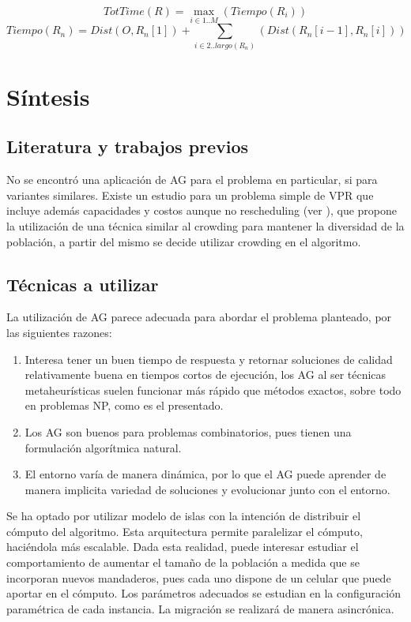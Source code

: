 \documentclass[9pt,conference]{IEEEtran}
\begin{document}
\[	TotTime(R) = \max\limits_{i \in 1..M}(Tiempo(R_i)) \]
\[	Tiempo(R_n) = Dist(O, R_n[1]) + \sum\limits_{i \in 2..largo(R_n)}(Dist(R_n[i-1], R_n[i])) \]

	\section{Síntesis}

	\subsection{Literatura y trabajos previos}

		No se encontró una aplicación de AG para el problema en particular, si para variantes similares. Existe un estudio para un problema simple de VPR que incluye además capacidades y costos aunque no rescheduling (ver \cite{refvrpprim}), que propone la utilización de una técnica similar al crowding para mantener la diversidad de la población, a partir del mismo se decide utilizar crowding en el algoritmo.

	\subsection{Técnicas a utilizar}

		La utilización de AG parece adecuada para abordar el problema planteado, por las siguientes razones:
		\begin{enumerate}
			\item
			Interesa tener un buen tiempo de respuesta y retornar soluciones de calidad relativamente buena en tiempos cortos de ejecución, los AG al ser técnicas metaheurísticas suelen funcionar más rápido que métodos exactos, sobre todo en problemas NP, como es el presentado.
			\item
			Los AG son buenos para problemas combinatorios, pues tienen una formulación algorítmica natural.
			\item
			El entorno varía de manera dinámica, por lo que el AG puede aprender de manera implicita variedad de soluciones y evolucionar junto con el entorno. 
		\end{enumerate}

		Se ha optado por utilizar modelo de islas con la intención de distribuir el cómputo del algoritmo. Esta arquitectura permite paralelizar el cómputo, haciéndola más escalable. Dada esta realidad, puede interesar estudiar el comportamiento de aumentar el tamaño de la población a medida que se incorporan nuevos mandaderos, pues cada uno dispone de un celular que puede aportar en el cómputo. Los parámetros adecuados se estudian en la configuración paramétrica de cada instancia. La migración se realizará de manera asincrónica.
\end{document}
